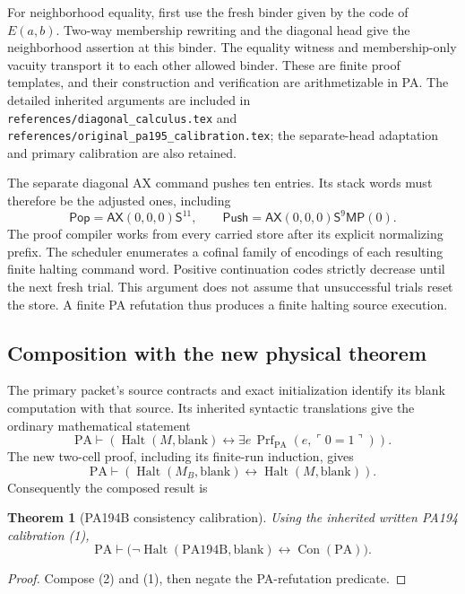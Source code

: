 \documentclass[11pt]{article}
\newtheorem{theorem}{Theorem}[section]
\newcommand{\PA}{\mathrm{PA}}
\newcommand{\Con}{\operatorname{Con}}
\newcommand{\Halt}{\operatorname{Halt}}
\newcommand{\Prf}{\operatorname{Prf}}
\newcommand{\file}[1]{\nolinkurl{#1}}
\newcommand{\BB}{M_B}
\begin{document}
For neighborhood equality, first use the fresh binder given by the code of
\(E(a,b)\). Two-way membership rewriting and the diagonal head give the
neighborhood assertion at this binder. The equality witness and
membership-only vacuity transport it to each other allowed binder. These
are finite proof templates, and their construction and verification are
arithmetizable in PA. The detailed inherited arguments are included in
\file{references/diagonal_calculus.tex} and
\file{references/original_pa195_calibration.tex}; the separate-head
adaptation and primary calibration are also retained.

The separate diagonal AX command pushes ten entries. Its stack words must
therefore be the adjusted ones, including
\[
 \mathsf{Pop}=\mathsf{AX}(0,0,0)\mathsf S^{11},\qquad
 \mathsf{Push}=\mathsf{AX}(0,0,0)\mathsf S^9\mathsf{MP}(0).
\]
The proof compiler works from every carried store after its explicit
normalizing prefix. The scheduler enumerates a cofinal family of encodings
of each resulting finite halting command word. Positive continuation codes
strictly decrease until the next fresh trial. This argument does not assume
that unsuccessful trials reset the store. A finite PA refutation thus
produces a finite halting source execution.

\subsection{Composition with the new physical theorem}
The primary packet's source contracts and exact initialization identify its
blank computation with that source. Its inherited syntactic translations
give the ordinary mathematical statement
\[
 \PA\vdash\left(\Halt(M,\mathrm{blank})\leftrightarrow
       \exists e\,\Prf_{\PA}(e,\ulcorner0=1\urcorner)\right).
 \tag{1}
\]
The new two-cell proof, including its finite-run induction, gives
\[
 \PA\vdash\left(\Halt(\BB,\mathrm{blank})
                    \leftrightarrow\Halt(M,\mathrm{blank})\right).
 \tag{2}
\]
Consequently the composed result is

\begin{minipage}{\linewidth}
\begin{theorem}[PA194B consistency calibration]
Using the inherited written PA194 calibration (1),
\[
 \boxed{\displaystyle
 \PA\vdash\bigl(\neg\Halt(\mathrm{PA194B},\mathrm{blank})
                       \leftrightarrow\Con(\PA)\bigr).}
\]
\end{theorem}
\begin{proof}
Compose (2) and (1), then negate the PA-refutation predicate.
\end{proof}
\end{minipage}
\end{document}
